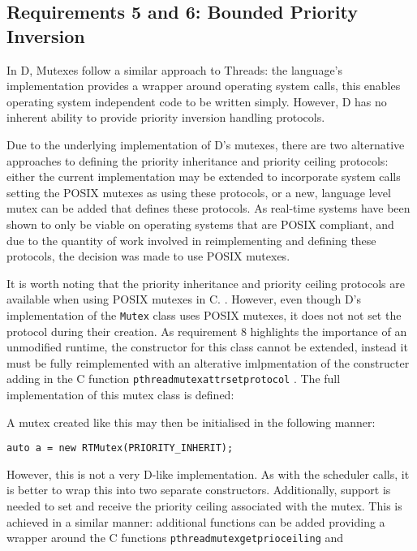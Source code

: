 \subsection{Requirements 5 and 6: Bounded Priority Inversion}
In D, Mutexes follow a similar approach to Threads: the language's
implementation provides a wrapper around operating system calls, this 
enables operating system independent code to be written simply. However, D has no 
inherent ability to provide priority inversion handling protocols. 
\par\bigskip\noindent
Due to the underlying implementation of D's mutexes, there are two alternative 
approaches to defining the priority inheritance and priority ceiling protocols: 
either the current implementation may be extended to incorporate system calls 
setting the POSIX mutexes as using these protocols, or a new, language level 
mutex can be added that defines these protocols. As real-time systems have been 
shown to only be viable on operating systems that are POSIX compliant, and due to 
the quantity of work involved in reimplementing and defining these protocols, the 
decision was made to use POSIX mutexes. 
\par\bigskip\noindent
It is worth noting that the priority inheritance and priority ceiling protocols 
are available when using POSIX mutexes in C. 
\cite{mutex-setprotocol}. However, even though D's implementation of the \texttt{Mutex} 
class uses POSIX mutexes, it does not not set the protocol during their creation. 
As requirement 8 highlights the importance of an unmodified runtime, the 
constructor for this class cannot be extended, instead it must be fully 
reimplemented with an alterative imlpmentation of the constructer adding in 
the C function \texttt{pthread\textunderscore{}mutexattr\textunderscore{}setprotocol} \cite{mutex-setprotocol}. 
The full implementation of this mutex class is defined:

A mutex created like this may then be initialised in the following manner: 
\begin{lstlisting}
auto a = new RTMutex(PRIORITY_INHERIT);
\end{lstlisting}
However, this is not a very D-like implementation. As with the scheduler calls, 
it is better to wrap this into two separate constructors. Additionally, support 
is needed to set and receive the priority ceiling associated with the 
mutex. This is achieved in a similar manner: additional 
functions can be added providing a wrapper around the C functions 
\texttt{pthread\textunderscore{}mutex\textunderscore{}getprioceiling} and 
